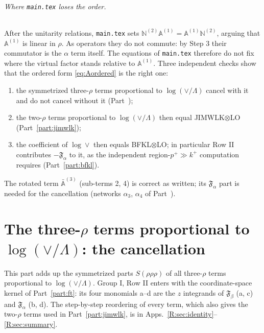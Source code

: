 \documentclass[10pt]{article}
\numberwithin{equation}{section}
\begin{document}
\paragraph{Where \texttt{main.tex} loses the order.} After the unitarity relations, \texttt{main.tex} sets $\mathbb N^{(2)}\mathbb A^{(1)}=\mathbb A^{(1)}\mathbb N^{(2)}$, arguing that $\mathbb A^{(1)}$ is linear in $\rho$. As operators they do not commute: by Step 3 their commutator is the $\alpha$ term itself. The equations of \texttt{main.tex} therefore do not fix where the virtual factor stands relative to $\mathbb A^{(1)}$. Three independent checks show that the ordered form \eqref{eq:Aordered} is the right one:
\begin{enumerate}
\item the symmetrized three-$\rho$ terms proportional to $\log(\vee/\Lambda)$ cancel with it and do not cancel without it (Part~\ref{part:three});
\item the two-$\rho$ terms proportional to $\log(\vee/\Lambda)$ then equal JIMWLK$\otimes$LO (Part~\ref{part:jimwlk});
\item the coefficient of $\log\vee$ then equals BFKL$\otimes$LO; in particular Row II contributes $-\mathfrak F_\alpha$ to it, as the independent region-$p^+\gg k^+$ computation requires (Part~\ref{part:bfkl}).
\end{enumerate}
The rotated term $\bar{\mathbb A}^{(3)}$ (sub-terms 2, 4) is correct as written; its $\mathfrak F_\alpha$ part is needed for the cancellation (networks $\alpha_3$, $\alpha_4$ of Part~\ref{part:three}).


\part{The three-\texorpdfstring{$\rho$}{rho} terms proportional to \texorpdfstring{$\log(\vee/\Lambda)$}{log(vee/Lambda)}: the cancellation}\label{part:three}
This part adds up the symmetrized parts $S(\rho\rho\rho)$ of all three-$\rho$ terms proportional to $\log(\vee/\Lambda)$. Group I, Row II enters with the coordinate-space kernel of Part~\ref{part:ft}: its four monomials a--d are the $z$ integrands of $\mathfrak F_\beta$ (a, c) and $\mathfrak F_\alpha$ (b, d). The step-by-step reordering of every term, which also gives the two-$\rho$ terms used in Part~\ref{part:jimwlk}, is in Apps.~\ref{R:sec:identity}--\ref{R:sec:summary}.
\end{document}
